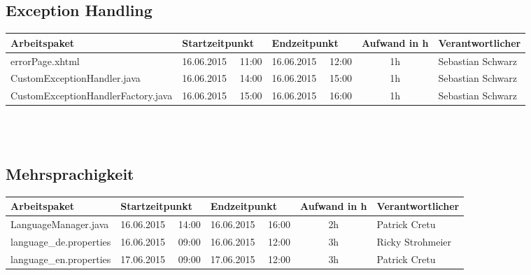 \begin{landscape}
	\subsection{Exception Handling}
	\begin{tabular}{|p{10.3cm}|p{3.2cm}|p{3.2cm}|c|p{3.5cm}|}
		\hline  \textbf{Arbeitspaket} & \textbf{Startzeitpunkt} & \textbf{Endzeitpunkt} & \textbf{Aufwand in h} & \textbf{Verantwortlicher} \\ 
		\hline   errorPage.xhtml                                        & 16.06.2015 \ \ 11:00       & 16.06.2015 \ \ 12:00        & 1h                 & Sebastian Schwarz\\  
		\hline   CustomExceptionHandler.java                            & 16.06.2015 \ \ 14:00       & 16.06.2015 \ \ 15:00        & 1h                 & Sebastian Schwarz\\  
		\hline   CustomExceptionHandlerFactory.java                     & 16.06.2015 \ \ 15:00       & 16.06.2015 \ \ 16:00        & 1h                 & Sebastian Schwarz\\  
		\hline 
	\end{tabular} \ \\
	\ \\	
	
	\subsection{Mehrsprachigkeit}
	\begin{tabular}{|p{10.3cm}|p{3.2cm}|p{3.2cm}|c|p{3.5cm}|}
		\hline  \textbf{Arbeitspaket} & \textbf{Startzeitpunkt} & \textbf{Endzeitpunkt} & \textbf{Aufwand in h} & \textbf{Verantwortlicher} \\ 
		\hline   LanguageManager.java                                  & 16.06.2015 \ \ 14:00        & 16.06.2015 \ \ 16:00        &  2h                 & Patrick Cretu\\ 
		\hline   language\_de.properties                               & 16.06.2015 \ \ 09:00        & 16.06.2015 \ \ 12:00        &  3h                 & Ricky Strohmeier\\
		\hline   language\_en.properties                               & 17.06.2015 \ \ 09:00        & 17.06.2015 \ \ 12:00        &  3h                 & Patrick Cretu\\ 
		\hline 
	\end{tabular} \ \\
	\ \\
	

\end{landscape}
